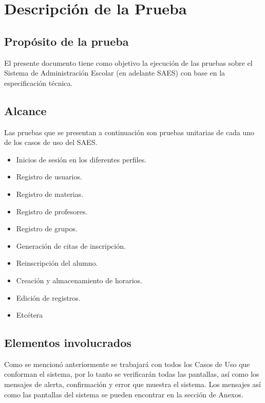 \newpage
\chapter{Descripción de la Prueba}
\section{Propósito de la prueba}
\noindent
El presente documento tiene como objetivo la ejecución de las pruebas sobre el Sistema de Administración Escolar (en adelante SAES) con base en la especificación técnica.
\section{Alcance}
\noindent
Las pruebas que se presentan a continuación son pruebas unitarias de cada uno de los casos de uso del SAES.
\begin{itemize}
    \item Inicios de sesión en los diferentes perfiles.
    \item Registro de usuarios.
    \item Registro de materias.
    \item Registro de profesores.
    \item Registro de grupos.
    \item Generación de citas de inscripción.
    \item Reinscripción del alumno.
    \item Creación y almacenamiento de horarios.
    \item Edición de registros.
    \item Etcétera
\end{itemize}
\section{Elementos involucrados}
\noindent
Como se mencionó anteriormente se trabajará con todos los Casos de Uso que conforman el sistema, por lo tanto se verificarán todas las pantallas, así como los mensajes de alerta, confirmación y error que muestra el sistema. Los mensajes así como las pantallas del sistema se pueden encontrar en la sección de Anexos.
